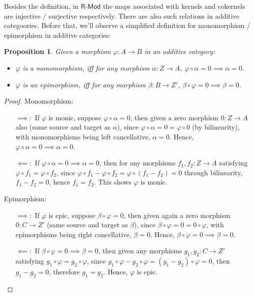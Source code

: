 \documentclass[x11names,reqno,12pt]{extarticle}
\newtheorem{prop}{Proposition}
\newcommand{\cat}[1]{\textsf{#1}}
\begin{document}
Besides the definition, in $\cat{R-Mod}$ the maps associated with kernels and cokernels are injective / surjective respectively. There are also such relations in additive categoories. Before that, we'll observe a simplified definition for monomorphism / epimorphism in additive categories:
\begin{prop}
    Given a morphism $\varphi:A\rightarrow B$ in an additive category:
    \begin{itemize}
        \item $\varphi$ is a monomorphism, iff for any morphism $\alpha:Z\rightarrow A$, $\varphi\circ \alpha = 0\implies \alpha=0$.
        \item $\varphi$ is an epimorphism, iff for any morphism $\beta:B\rightarrow Z'$, $\beta\circ \varphi = 0 \implies \beta=0$.
    \end{itemize}
\end{prop}
\begin{proof}
    Monomorphism:
    \begin{itemize}
        \item[$\implies:$] If $\varphi$ is monic, suppose $\varphi\circ\alpha = 0$, then given a zero morphism $0:Z\rightarrow A$ also (same source and target as $\alpha$), since $\varphi\circ\alpha = 0=\varphi\circ 0$ (by bilinearity), with monomorphisms being left cancellative, $\alpha = 0$. Hence, $\varphi\circ\alpha=0\implies \alpha=0$.
        \item[$\impliedby:$] If $\varphi\circ\alpha = 0\implies \alpha=0$, then for any morphisms $f_1,f_2:Z\rightarrow A$ satisfying $\varphi\circ f_1=\varphi\circ f_2$, since $\varphi\circ f_1 - \varphi\circ f_2 = \varphi\circ(f_1-f_2) = 0$ through bilinearity, $f_1-f_2=0$, hence $f_1=f_2$. This shows $\varphi$ is monic.
    \end{itemize}

    Epimorphism:
    \begin{itemize}
        \item[$\implies:$] If $\varphi$ is epic, suppose $\beta\circ \varphi = 0$, then given again a zero morphism $0:C\rightarrow Z'$ (same source and target as $\beta$), since $\beta\circ\varphi = 0 = 0\circ \varphi$, with epimorphisms being right cancellative, $\beta = 0$. Hence, $\beta\circ\varphi=0\implies \beta=0$.
        \item[$\impliedby:$] If $\beta\circ\varphi = 0\implies \beta=0$, then given any morphisms $g_1,g_2:C\rightarrow Z'$ satisfying $g_1\circ\varphi = g_2\circ\varphi$, since $g_1\circ\varphi-g_2\circ\varphi = (g_1-g_2)\circ\varphi = 0$, then $g_1-g_2 = 0$, therefore $g_1=g_2$. Hence, $\varphi$ is epic.
    \end{itemize}
\end{proof}
\end{document}
